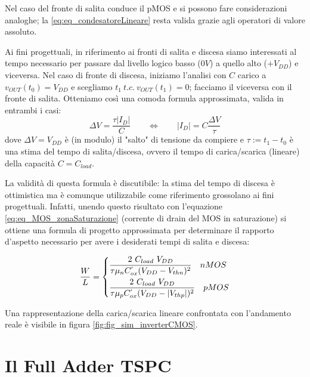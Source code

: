 Nel caso del fronte di salita conduce il pMOS e si possono fare considerazioni analoghe; la \ref{eq:eq_condesatoreLineare} resta valida grazie agli operatori di valore assoluto.

Ai fini progettuali, in riferimento ai fronti di salita e discesa siamo interessati al tempo necessario per passare dal livello logico basso ($0V$) a quello alto  ($+V_{DD}$) e viceversa. Nel caso di fronte di discesa, iniziamo l'analisi con $C$ carico a $v_{OUT}(t_0) = V_{DD}$ e scegliamo $t_1 \ t.c. \ v_{OUT}(t_1) = 0$; facciamo il viceversa con il fronte di salita. Otteniamo così una comoda formula approssimata, valida in entrambi i casi:
\begin{equation}
\Delta V = \frac{\tau \left | I_D \right |}{C} \qquad \Leftrightarrow \qquad \left | I_D \right | = C \frac{\Delta V}{\tau}
\label{eq:eq_condensatoreLineareFinale}
\end{equation}
dove $\Delta V = V_{DD}$ è (in modulo) il "salto" di tensione da compiere e $\tau := t_1 - t_0$ è una stima del tempo di salita/discesa, ovvero il tempo di carica/scarica (lineare) della capacità $C = C_{load}$.

La validità di questa formula è discutibile: la stima del tempo di discesa è ottimistica ma è comunque utilizzabile come riferimento grossolano ai fini progettuali. Infatti, unendo questo risultato con l'equazione \ref{eq:eq_MOS_zonaSaturazione} (corrente di drain del MOS in saturazione) si ottiene una formula di progetto approssimata per determinare il rapporto d'aspetto necessario per avere i desiderati tempi di salita e discesa:

\begin{equation}
\frac{W}{L} =
\begin{dcases}
\frac{2 \ C_{load} \ V_{DD}}{\tau \mu _{n} C^{'}_{ox} (V_{DD}-V_{thn})^2} \quad nMOS\\
\frac{2\ C_{load} \ V_{DD}}{\tau \mu _{p} C^{'}_{ox} (V_{DD}-|V_{thp}|)^2} \quad pMOS
\end{dcases}
\label{eq:formulaRapportoAspetto}
\end{equation}

Una rappresentazione della carica/scarica lineare confrontata con l'andamento reale è visibile in figura \ref{fig:fig_sim_inverterCMOS}.

\section{Il Full Adder TSPC}
\label{sec:sec_fullAdder}

